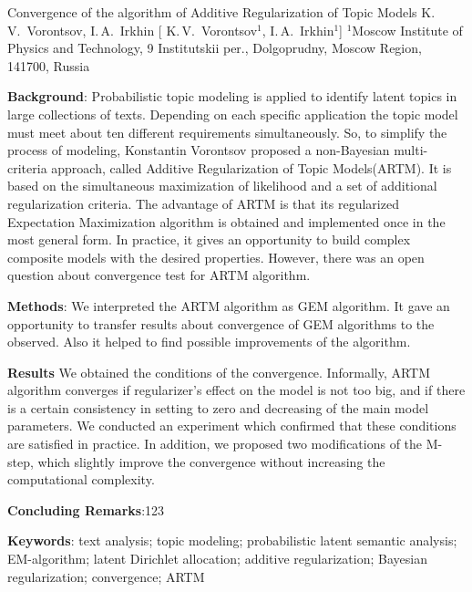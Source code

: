 \documentclass[12pt, twoside]{article}
\begin{document}
\titleEng
{Convergence of the algorithm of Additive Regularization of Topic Models}
\authorEng
    {K.\,V.~Vorontsov, I.\,A.~Irkhin}
    [ K.\,V.~Vorontsov$^{1}$, I.\,A.~Irkhin$^{1}$]
\organizationEng
    {$^1$Moscow Institute of Physics and Technology, 9 Institutskii per., Dolgoprudny, Moscow Region, 141700, Russia}
\abstractEng
    {
	\noindent
	\textbf{Background}: Probabilistic topic modeling is applied to identify latent topics in large collections of texts. Depending on each specific application the topic model must meet about ten different requirements simultaneously. So, to simplify the process of modeling, Konstantin Vorontsov proposed a non-Bayesian multi-criteria approach, called Additive Regularization of Topic Models(ARTM). It is based on the simultaneous maximization  of likelihood and a set of additional regularization criteria. The advantage of ARTM  is that its regularized Expectation Maximization algorithm is obtained and implemented once in the most general form. In practice, it gives an opportunity to build complex composite models with the desired properties. However, there was an open question about convergence test for ARTM algorithm.
	
	\noindent
	\textbf{Methods}: We interpreted the ARTM algorithm as GEM algorithm. It gave an opportunity to transfer results about convergence of GEM algorithms to the observed. Also it helped to find possible improvements of the algorithm.
	
	\noindent
	\textbf{Results} We obtained the conditions of the convergence. Informally, ARTM algorithm converges if regularizer's effect on the model is not too big, and if there is a certain consistency in setting to zero and decreasing  of the main model parameters.  We conducted an experiment which confirmed that these conditions are satisfied in practice. In addition, we proposed two modifications of the M-step, which slightly improve the convergence without increasing the computational complexity.
	
	\noindent
	\textbf{Concluding Remarks}:123
		
	\noindent
    	\textbf{Keywords}:  { text analysis; topic modeling; probabilistic latent semantic analysis; EM-algorithm; latent Dirichlet
allocation; additive regularization; Bayesian regularization; convergence; ARTM}
}


\maketitle
\linenumbers
\end{document}
